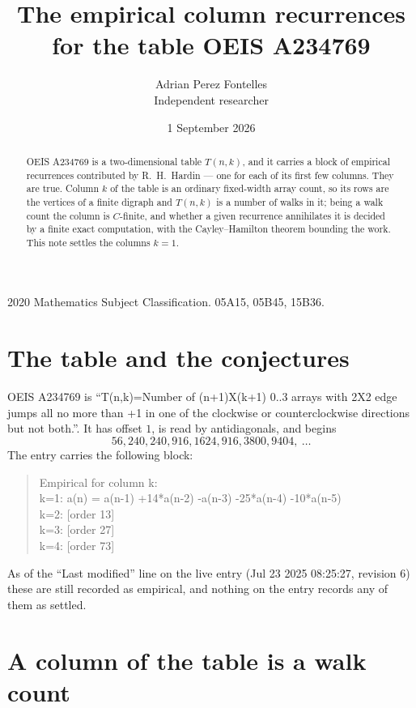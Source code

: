 \documentclass[11pt,a4paper]{article}
\title{The empirical column recurrences for the table OEIS A234769}
\author{Adrian Perez Fontelles\\ \small Independent researcher}
\date{1 September 2026}
\theoremstyle{plain}
\theoremstyle{definition}
\begin{document}
\maketitle

\begin{abstract}
OEIS A234769 is a two-dimensional table $T(n,k)$, and it carries a block of empirical
recurrences contributed by R.~H.~Hardin --- one for each of its first few columns. They are
true. Column $k$ of the table is an ordinary fixed-width array count, so its rows are the
vertices of a finite digraph and $T(n,k)$ is a number of walks in it; being a walk count the
column is $C$-finite, and whether a given recurrence annihilates it is decided by a finite
exact computation, with the Cayley--Hamilton theorem bounding the work. This note settles the columns $k=1$.
\end{abstract}

\noindent\small 2020 Mathematics Subject Classification. 05A15, 05B45, 15B36.\normalsize

\section{The table and the conjectures}

OEIS A234769 is ``T(n,k)=Number of (n+1)X(k+1) 0..3 arrays with 2X2 edge jumps all no more than +1 in one of the clockwise or counterclockwise directions but not both.''. It has offset $1$, is
read by antidiagonals, and begins
\[
56, 240, 240, 916, 1624, 916, 3800, 9404,\ \dots
\]
The entry carries the following block:
\begin{quote}\small
Empirical for column k:\\
k=1: a(n) = a(n-1) +14*a(n-2) -a(n-3) -25*a(n-4) -10*a(n-5)\\
k=2: [order 13]\\
k=3: [order 27]\\
k=4: [order 73]\\
\end{quote}
As of the ``Last modified'' line on the live entry (Jul 23 2025 08:25:27, revision 6) these are still
recorded as empirical, and nothing on the entry records any of them as settled.

\section{A column of the table is a walk count}
\end{document}
